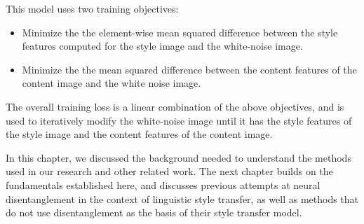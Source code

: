 This model uses two training objectives:
\begin{itemize}
	\item Minimize the the element-wise mean squared difference between the style features computed for the style image and the white-noise image.
	\item Minimize the the mean squared difference between the content features of the content image and the white noise image.
\end{itemize}

The overall training loss is a linear combination of the above objectives, and is used to iteratively modify the white-noise image until it has the style features of the style image and the content features of the content image.


In this chapter, we discussed the background needed to understand the methods used in our research and other related work. The next chapter builds on the fundamentals established here, and discusses previous attempts at neural disentanglement in the context of linguistic style transfer, as well as methods that do not use disentanglement as the basis of their style transfer model.
